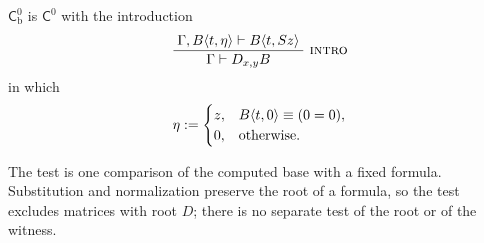 \begin{definition}
\label{claus:def:c0b}
$\mathsf{C}^{0}_{\mathrm{b}}$ is $\mathsf{C}^{0}$ with the introduction
\[
 \infrule{\Gamma,B\langle t,\eta\rangle\proves B\langle t,\Suc z\rangle}
         {\Gamma\proves\D{x}{y}B}\ \rulename{Intro}
\]
in which
\[
 \eta\mathrel{:=}
 \begin{cases}
 z,&B\langle t,0\rangle\equiv(0=0),\\
 0,&\text{otherwise.}
 \end{cases}
\]
\end{definition}

The test is one comparison of the computed base with a fixed formula.
Substitution and normalization preserve the root of a formula, so the test
excludes matrices with root $D$; there is no separate test of the root or
of the witness.

